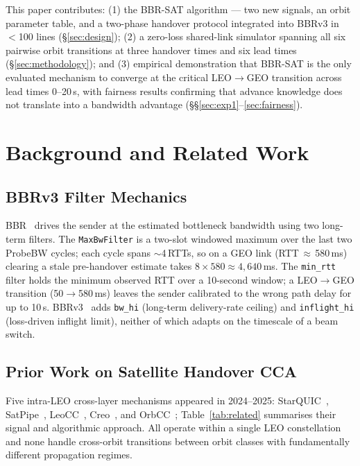 \documentclass[conference]{IEEEtran}
\begin{document}
This paper contributes: (1) the BBR-SAT algorithm --- two new signals,
an orbit parameter table, and a two-phase handover protocol integrated
into BBRv3 in $<$100 lines (\S\ref{sec:design}); (2) a zero-loss
shared-link simulator spanning all six pairwise orbit transitions at
three handover times and six lead times (\S\ref{sec:methodology});
and (3) empirical demonstration that BBR-SAT is the only evaluated
mechanism to converge at the critical LEO$\to$GEO transition across
lead times 0--20\,s, with fairness results confirming that advance
knowledge does not translate into a bandwidth advantage
(\S\S\ref{sec:exp1}--\ref{sec:fairness}).

\section{Background and Related Work}
\label{sec:related}

\subsection{BBRv3 Filter Mechanics}

BBR~\cite{cardwell2016bbr} drives the sender at the estimated bottleneck
bandwidth using two long-term filters.
The \texttt{MaxBwFilter} is a two-slot windowed maximum over the last two
ProbeBW cycles; each cycle spans $\sim$4\,RTTs, so on a GEO link
(RTT\,$\approx$\,580\,ms) clearing a stale pre-handover estimate takes
$8 \times 580 \approx 4{,}640$\,ms.
The \texttt{min\_rtt} filter holds the minimum observed RTT over a
10-second window; a LEO$\to$GEO transition (50$\to$580\,ms) leaves the
sender calibrated to the wrong path delay for up to 10\,s.
BBRv3~\cite{cardwell2026bbr} adds \texttt{bw\_hi} (long-term
delivery-rate ceiling) and \texttt{inflight\_hi} (loss-driven inflight
limit), neither of which adapts on the timescale of a beam switch.

\subsection{Prior Work on Satellite Handover CCA}

Five intra-LEO cross-layer mechanisms appeared in 2024--2025:
StarQUIC~\cite{zhao2024starquic}, SatPipe~\cite{zhao2025satpipe},
LeoCC~\cite{lai2025leocc}, Creo~\cite{yan2025creo},
and OrbCC~\cite{valentine2025orbcc}; Table~\ref{tab:related} summarises
their signal and algorithmic approach.
All operate within a single LEO constellation and none handle cross-orbit
transitions between orbit classes with fundamentally different propagation
regimes.
\end{document}
